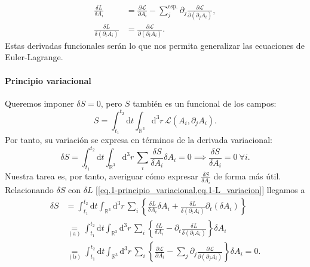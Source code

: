 \begin{subequations}
    \begin{align}
        \label{eq.1-L_derivadafuncionalA}
        \frac{\delta L}{\delta A_i} &= \frac{\partial\mathcal{L}}{\partial A_i} -  \sum_j^\text{esp.} \partial_j \frac{\partial \mathcal{L}}{\partial(\partial_j A_i)},\\
        \frac{\delta L}{\delta (\partial_t A_i)} &= \frac{\partial \mathcal{L}}{\partial(\partial_t A_i)}.
    \end{align}
\end{subequations}
Estas derivadas funcionales serán lo que nos permita generalizar las ecuaciones de Euler-Lagrange. 

\paragraph{Principio variacional} Queremos imponer \(\delta S = 0\), pero \(S\) también es un funcional de los campos:
\begin{equation}
    S = \int_{t_1}^{t_2}\mathrm{d}t\int_{\mathbb{R}^3}\mathrm{d}^3r\, \mathcal{L}(A_i, \partial_j A_i).
\end{equation}
Por tanto, su variación se expresa en términos de la derivada variacional:
\begin{equation}
    \delta S = \int_{t_1}^{t_2}\mathrm{d}t\int_{\mathbb{R}^3}\mathrm{d}^3r\, \sum_i \frac{\delta S}{\delta A_i} \delta A_i = 0 \implies \frac{\delta S}{\delta A_i} = 0\ \forall i.
\end{equation}
Nuestra tarea es, por tanto, averiguar cómo expresar \(\frac{\delta S}{\delta A_i}\) de forma más útil. Relacionando \(\delta S\) con \(\delta L\) [\cref{eq.1-principio_variacional,eq.1-L_variacion}] llegamos a 
\begin{align*}
    \delta S &= \int_{t_1}^{t_2}\mathrm{d}t\int_{\mathbb{R}^3}\mathrm{d}^3r\, \sum_i \left\{\frac{\delta L}{\delta A_i} \delta A_i + \frac{\delta L}{\delta (\partial_t A_i)} \partial_t(\delta A_i) \right\} \\
    &\underset{(\mathrm{a})}{=} \int_{t_1}^{t_2}\mathrm{d}t\int_{\mathbb{R}^3}\mathrm{d}^3r\, \sum_i \left\{\frac{\delta L}{\delta A_i} - \partial_t\frac{\delta L}{\delta (\partial_t A_i)} \right\}\delta A_i \\
    &\underset{(\mathrm{b})}{=} \int_{t_1}^{t_2}\mathrm{d}t\int_{\mathbb{R}^3}\mathrm{d}^3r\, \sum_i \left\{\frac{\partial\mathcal{L}}{\partial A_i} -  \sum_j \partial_j \frac{\partial \mathcal{L}}{\partial(\partial_j A_i)} \right\}\delta A_i = 0.
\end{align*}
